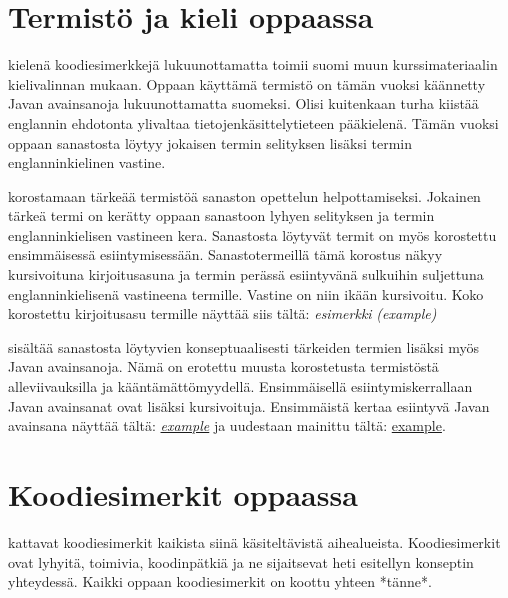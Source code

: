 \documentclass{tufte-book}
\newcommand{\eng}[1]{\textit{(#1)}}
\newcommand{\newnogls}[1]{\textit{#1}}
\newcommand{\newengnogls}[2]{\newnogls{#1} \eng{#2}}
\newcommand{\javanogls}[1]{\underline{#1}}
\newcommand{\newjavanogls}[1]{\textit{\javanogls{#1}}}
\begin{document}

\section{Termistö ja kieli oppaassa}
\label{kielestä}

 kielenä koodiesimerkkejä lukuunottamatta toimii suomi muun
kurssimateriaalin kielivalinnan mukaan. Oppaan käyttämä termistö on tämän vuoksi käännetty Javan
avainsanoja lukuunottamatta suomeksi. Olisi kuitenkaan turha kiistää englannin ehdotonta ylivaltaa
tietojenkäsittelytieteen pääkielenä. Tämän vuoksi oppaan sanastosta löytyy jokaisen termin
selityksen lisäksi termin englanninkielinen vastine.

 korostamaan tärkeää termistöä sanaston opettelun helpottamiseksi.
Jokainen tärkeä termi on kerätty oppaan sanastoon lyhyen selityksen ja termin englanninkielisen
vastineen kera. Sanastosta löytyvät termit on myös korostettu ensimmäisessä esiintymisessään.
Sanastotermeillä tämä korostus näkyy kursivoituna kirjoitusasuna ja termin perässä esiintyvänä
sulkuihin suljettuna englanninkielisenä vastineena termille. Vastine on niin ikään kursivoitu.
Koko korostettu kirjoitusasu termille näyttää siis tältä: \newengnogls{esimerkki}{example}

 sisältää sanastosta löytyvien konseptuaalisesti tärkeiden termien
lisäksi myös Javan avainsanoja. Nämä on erotettu muusta korostetusta termistöstä alleviivauksilla
ja kääntämättömyydellä. Ensimmäisellä esiintymiskerrallaan Javan avainsanat ovat lisäksi
kursivoituja. Ensimmäistä kertaa esiintyvä Javan avainsana näyttää tältä: \newjavanogls{example}
ja uudestaan mainittu tältä: \javanogls{example}.


\section{Koodiesimerkit oppaassa}
\label{koodiesimerkeistä}

 kattavat koodiesimerkit kaikista siinä käsiteltävistä aihealueista.
Koodiesimerkit ovat lyhyitä, toimivia, koodinpätkiä ja ne sijaitsevat heti esitellyn konseptin
yhteydessä. Kaikki oppaan koodiesimerkit on koottu yhteen *tänne*. %
\end{document}
